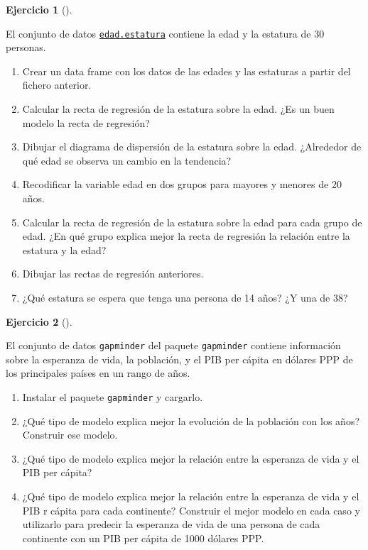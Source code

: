 \documentclass[
  a4paper,
]{scrreport}
\theoremstyle{definition}
\newtheorem{exercise}{Ejercicio}[chapter]
\theoremstyle{remark}
\begin{document}
\begin{exercise}[]\protect\hypertarget{exr-regresion-7}{}\label{exr-regresion-7}

El conjunto de datos
\href{https://aprendeconalf.es/estadistica-practicas-r/datos/edad-estatura.csv}{\texttt{edad.estatura}}
contiene la edad y la estatura de 30 personas.

\begin{enumerate}
\def\labelenumi{\alph{enumi}.}
\item
  Crear un data frame con los datos de las edades y las estaturas a
  partir del fichero anterior.
\item
  Calcular la recta de regresión de la estatura sobre la edad. ¿Es un
  buen modelo la recta de regresión?
\item
  Dibujar el diagrama de dispersión de la estatura sobre la edad.
  ¿Alrededor de qué edad se observa un cambio en la tendencia?
\item
  Recodificar la variable edad en dos grupos para mayores y menores de
  20 años.
\item
  Calcular la recta de regresión de la estatura sobre la edad para cada
  grupo de edad. ¿En qué grupo explica mejor la recta de regresión la
  relación entre la estatura y la edad?
\item
  Dibujar las rectas de regresión anteriores.
\item
  ¿Qué estatura se espera que tenga una persona de 14 años? ¿Y una de
  38?
\end{enumerate}

\end{exercise}

\begin{exercise}[]\protect\hypertarget{exr-regresion-8}{}\label{exr-regresion-8}

El conjunto de datos \texttt{gapminder} del paquete \texttt{gapminder}
contiene información sobre la esperanza de vida, la población, y el PIB
per cápita en dólares PPP de los principales países en un rango de años.

\begin{enumerate}
\def\labelenumi{\alph{enumi}.}
\item
  Instalar el paquete \texttt{gapminder} y cargarlo.
\item
  ¿Qué tipo de modelo explica mejor la evolución de la población con los
  años? Construir ese modelo.
\item
  ¿Qué tipo de modelo explica mejor la relación entre la esperanza de
  vida y el PIB per cápita?
\item
  ¿Qué tipo de modelo explica mejor la relación entre la esperanza de
  vida y el PIB r cápita para cada continente? Construir el mejor modelo
  en cada caso y utilizarlo para predecir la esperanza de vida de una
  persona de cada continente con un PIB per cápita de 1000 dólares PPP.
\end{enumerate}

\end{exercise}
\end{document}
